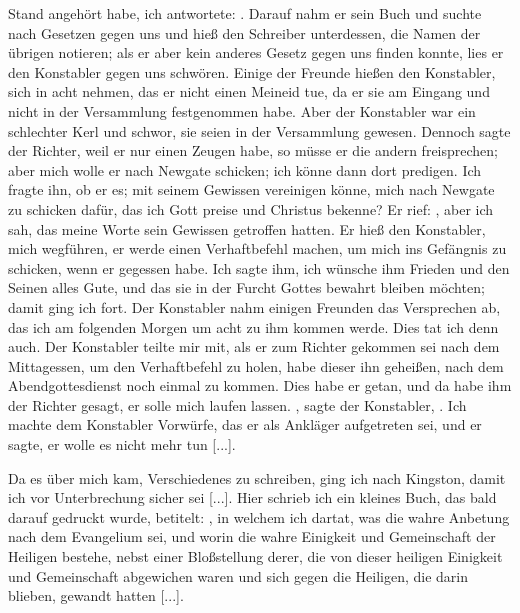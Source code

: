 Stand angehört habe, ich antwortete: . Darauf
nahm er sein Buch und suchte nach Gesetzen gegen uns und hieß
den Schreiber unterdessen, die Namen der übrigen notieren; als
er aber kein anderes Gesetz gegen uns finden konnte, lies er den
Konstabler gegen uns schwören. Einige der Freunde hießen den
Konstabler, sich in acht nehmen, das er nicht einen Meineid tue,
da er sie am Eingang und nicht in der Versammlung festgenommen 
habe. Aber der Konstabler war ein schlechter Kerl und
schwor, sie seien in der Versammlung gewesen.
Dennoch sagte der Richter, weil er nur einen Zeugen habe,
so müsse er die andern freisprechen; aber mich wolle er nach
Newgate schicken; ich könne dann dort predigen. Ich fragte ihn,
ob er es; mit seinem Gewissen vereinigen könne, mich nach 
Newgate zu schicken dafür, das ich Gott preise und Christus bekenne?
Er rief: , aber ich sah, das meine Worte
sein Gewissen getroffen hatten. Er hieß den Konstabler, mich
wegführen, er werde einen Verhaftbefehl machen, um mich ins
Gefängnis zu schicken, wenn er gegessen habe. Ich sagte ihm,
ich wünsche ihm Frieden und den Seinen alles Gute, und das sie
in der Furcht Gottes bewahrt bleiben möchten; damit ging ich
fort. Der Konstabler nahm einigen Freunden das Versprechen
ab, das ich am folgenden Morgen um acht zu ihm kommen werde.
Dies tat ich denn auch. Der Konstabler teilte mir mit, als er
zum Richter gekommen sei nach dem Mittagessen, um den Verhaftbefehl 
zu holen, habe dieser ihn geheißen, nach dem Abendgottesdienst 
noch einmal zu kommen. Dies habe er getan, und da
habe ihm der Richter gesagt, er solle mich laufen lassen. ,
sagte der Konstabler, . Ich machte dem
Konstabler Vorwürfe, das er als Ankläger aufgetreten sei, und
er sagte, er wolle es nicht mehr tun [...].

Da es über mich kam, Verschiedenes zu schreiben, ging ich
nach Kingston, damit ich vor Unterbrechung 
sicher sei [...]. Hier
schrieb ich ein kleines Buch, das bald darauf gedruckt wurde, betitelt: 
, in welchem ich dartat, was die wahre 
Anbetung nach dem Evangelium sei, und worin die wahre Einigkeit
und Gemeinschaft der Heiligen 
bestehe, nebst einer Bloßstellung
derer, die von dieser heiligen Einigkeit und Gemeinschaft 
abgewichen waren und sich gegen die Heiligen, die darin blieben, 
gewandt hatten [...].

